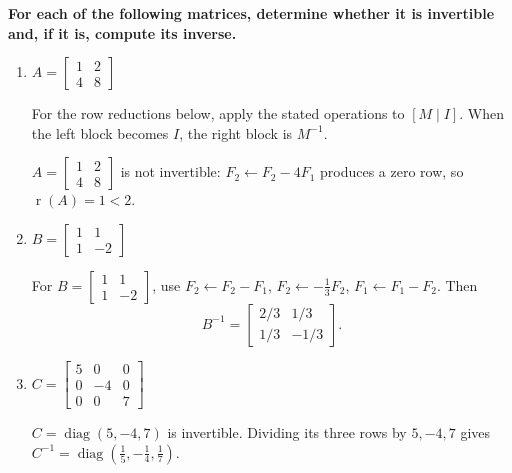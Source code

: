 \providecommand{\rank}{\operatorname{r}}
\providecommand{\RR}{\mathbb R}
\providecommand{\CC}{\mathbb C}
\providecommand{\KK}{\mathbb K}

\setcounter{enumi}{25}
\item {\bfseries\boldmath
For each of the following matrices, determine whether it is invertible and, if it is, compute its inverse.
}

\begin{enumerate}[label=\alph*)]

\item $A=\begin{bmatrix}1&2\\4&8\end{bmatrix}$

\begin{answer}
For the row reductions below, apply the stated operations to $[M\mid I]$.
When the left block becomes $I$, the right block is $M^{-1}$.

$A=\begin{bmatrix}1&2\\4&8\end{bmatrix}$ is not invertible:
$F_2\gets F_2-4F_1$ produces a zero row, so $\rank(A)=1<2$.
\end{answer}

\item $B=\begin{bmatrix}1&1\\1&-2\end{bmatrix}$

\begin{answer}
For $B=\begin{bmatrix}1&1\\1&-2\end{bmatrix}$, use
$F_2\gets F_2-F_1$, $F_2\gets-\frac13F_2$, $F_1\gets F_1-F_2$.
Then
\[
 B^{-1}=\begin{bmatrix}2/3&1/3\\1/3&-1/3\end{bmatrix}.
\]
\end{answer}

\item $C=\begin{bmatrix}5&0&0\\0&-4&0\\0&0&7\end{bmatrix}$

\begin{answer}
$C=\operatorname{diag}(5,-4,7)$ is invertible. Dividing its three rows
by $5,-4,7$ gives
$C^{-1}=\operatorname{diag}(\frac15,-\frac14,\frac17)$.
\end{answer}


\end{enumerate}
